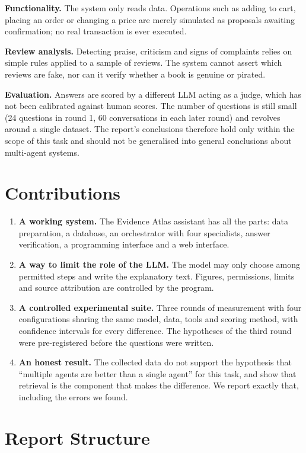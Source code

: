 \textbf{Functionality.} The system only reads data. Operations such as adding to cart, placing an order or changing a price are merely simulated as proposals awaiting confirmation; no real transaction is ever executed.

\textbf{Review analysis.} Detecting praise, criticism and signs of complaints relies on simple rules applied to a sample of reviews. The system cannot assert which reviews are fake, nor can it verify whether a book is genuine or pirated.

\textbf{Evaluation.} Answers are scored by a different LLM acting as a judge, which has not been calibrated against human scores. The number of questions is still small (24 questions in round 1, 60 conversations in each later round) and revolves around a single dataset. The report's conclusions therefore hold only within the scope of this task and should not be generalised into general conclusions about multi-agent systems.

\section{Contributions}

\begin{enumerate}
    \item \textbf{A working system.} The Evidence Atlas assistant has all the parts: data preparation, a database, an orchestrator with four specialists, answer verification, a programming interface and a web interface.
    \item \textbf{A way to limit the role of the LLM.} The model may only choose among permitted steps and write the explanatory text. Figures, permissions, limits and source attribution are controlled by the program.
    \item \textbf{A controlled experimental suite.} Three rounds of measurement with four configurations sharing the same model, data, tools and scoring method, with confidence intervals for every difference. The hypotheses of the third round were pre-registered before the questions were written.
    \item \textbf{An honest result.} The collected data do not support the hypothesis that ``multiple agents are better than a single agent'' for this task, and show that retrieval is the component that makes the difference. We report exactly that, including the errors we found.
\end{enumerate}

\section{Report Structure}

